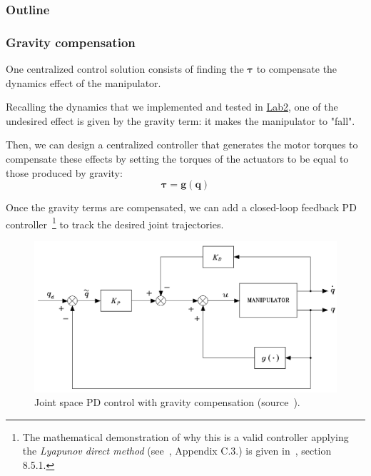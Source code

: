 \documentclass[10pt, aspectratio=169]{beamer}
\theoremstyle{remark}
\theoremstyle{definition}
\begin{document}
\begin{frame}
	\frametitle{Outline} %
\end{frame}

\begin{frame}[allowframebreaks]
\frametitle{Gravity compensation}

One centralized control solution consists of finding the $\boldsymbol{\tau}$ to compensate the dynamics effect of the manipulator. 

Recalling the dynamics that we implemented and tested in \href{https://jmgandarias.com/advanced_robotics/lab2/}{Lab2}, one of the undesired effect is given by the gravity term: it makes the manipulator to "fall". 

Then, we can design a centralized controller that generates the motor torques to compensate these effects by setting the torques of the actuators to be equal to those produced by gravity:
\begin{equation}
    \boldsymbol{\tau} = \mathbf{g}(\mathbf{q})
\end{equation}

\framebreak

Once the gravity terms are compensated, we can add a closed-loop feedback PD controller~\footnote{The mathematical demonstration of why this is a valid controller applying the \textit{Lyapunov direct method} (see~\cite{sciavicco2010robotics}, Appendix C.3.) is given in~\cite{sciavicco2010robotics}, section 8.5.1.} to track the desired joint trajectories.

\begin{figure}
    \centering
    \includegraphics[width=0.6\linewidth]{images/PD_gravity_compensation.png}
    \caption{Joint space PD control with gravity compensation (source~\cite{sciavicco2010robotics}).}
    \label{fig:PD_gravity_compensation}
\end{figure}
	
\end{frame}
\end{document}
